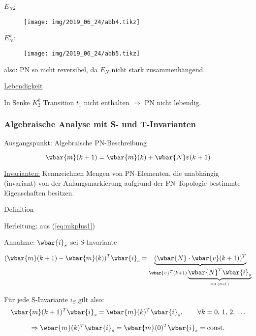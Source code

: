 \underline{$E_N$:}

\begin{figure}[H]
	\centering
	\texttt{[image: img/2019\_06\_24/abb4.tikz]}
\end{figure}


\underline{$E_N^k$:}

\begin{figure}[H]
	\centering
	\texttt{[image: img/2019\_06\_24/abb5.tikz]}
\end{figure}

also: PN so nicht reversibel, da $E_N$ nicht stark zusammenhängend.

\underline{Lebendigkeit}

In Senke $K_2^k$ Transition $t_1$ nicht enthalten $\Rightarrow$ PN nicht lebendig.

\subsubsection{Algebraische Analyse mit S- und T-Invarianten}
Ausgangspunkt: Algebraische PN-Beschreibung 

\begin{equation}\label{eq:mkplus1}
	\wbar{m}(k+1) = \wbar{m}(k) + \wbar{N} v(k+1)
\end{equation}

\underline{Invarianten:} Kennzeichnen Mengen von PN-Elementen, die unabhängig (invariant) von der Anfangsmarkierung aufgrund der PN-Topologie bestimmte Eigenschaften besitzen.

Definition 

Herleitung: aus (\ref{eq:mkplus1})

Annahme: $\wbar{i}_s$ sei S-Invariante

\begin{equation}
	(\wbar{m}(k+1)-\wbar{m}(k))^T \wbar{i}_s= \underbrace{(\wbar{N} \cdot \wbar{v}(k+1))^T}_{\wbar{v}^T(k+1) \underbrace{\wbar{N}^T \wbar{i}_s}_{=0 \text{ (Def.)}}}
\end{equation}

Für jede S-Invariante $i_S$ gilt also:
\begin{equation}
	\wbar{m}(k+1)^T \wbar{i}_s = \wbar{m}(k)^T \wbar{i}_s, \qquad \forall k=0,\,1,\,2,\,\ldots
\end{equation}

\begin{equation}
\Rightarrow \wbar{m}(k)^T \wbar{i}_s = \wbar{m}(0)^T \wbar{i}_s = \text{const.}
\end{equation}

